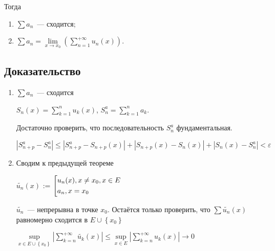 \documentclass{article}
\begin{document}
        Тогда
        
        \begin{enumerate}
        
            \item $\sum a_n$~--- сходится;
            
            \item $\sum a_n = \lim\limits_{x \rightarrow x_0} \left( \sum\limits^{+\infty}_{n = 1} u_n(x) \right)$.
            
        \end{enumerate}
        
        \subsection{Доказательство}
        
            \begin{enumerate}
            
                \item $\sum a_n$~--- сходится
                
                    $S_n(x) = \sum\limits^n_{k = 1} u_k(x)$, $S^a_n = \sum\limits^n_{k = 1} a_k$.
                    
                    Достаточно проверить, что последовательность $S^a_n$ фундаментальная.
                    
                    $\left| S^a_{n + p} - S^a_n \right| \leq \left| S^a_{n + p} - S_{n + p} (x) \right| + \left| S_{n + p}(x) - S_n(x) \right| + \left| S_n(x) - S^a_n \right| < \varepsilon$
                    
                \item Сводим к предыдущей теореме
                
                    $\widetilde{u_n}(x)$ := $\left[
                        \begin{gathered} 
                            u_n(x), x \neq x_0, x \in E 
                            \\ 
                            a_n, x = x_0 \hfill
                        \end{gathered}
                        \right.$
                    
                    $\widetilde{u_n}$~--- непрерывна в точке $x_0$. Остаётся только проверить, что $\sum \widetilde{u_n}(x)$ равномерно сходится в $E \cup \left\{ x_0 \right\}$
                    
                    $\sup\limits_{x \in E \cup \left\{ x_0 \right\}} \left| \sum\limits^{+\infty}_{k = n} \widetilde{u_k}(x) \right| \leq \sup\limits_{x \in E} \left| \sum\limits^{+\infty}_{k = n} u_k(x) \right| \rightarrow 0$
                    
            \end{enumerate}
        
\end{document}

